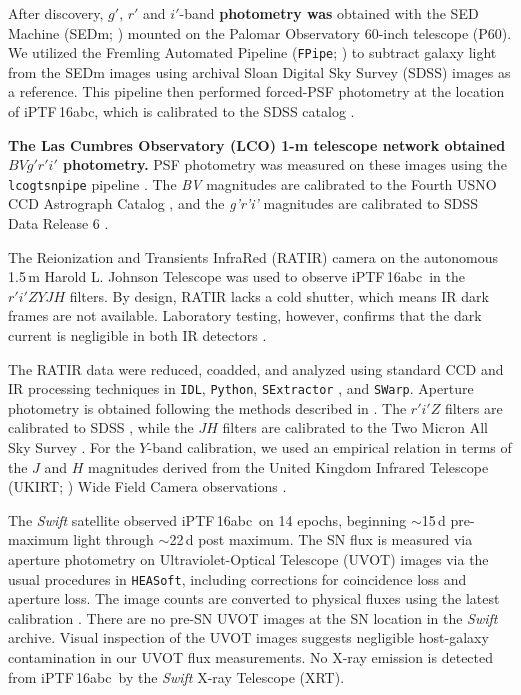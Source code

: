 \documentclass[twocolumn]{aastex61}
\newcommand{\abc}{iPTF\,16abc}
\begin{document}
After discovery, $g'$, $r'$ and $i'$-band \textbf{photometry was} obtained
with the SED Machine (SEDm; \citealt{2017arXiv171002917B}) mounted on the
Palomar Observatory 60-inch telescope (P60). We utilized the Fremling
Automated Pipeline (\texttt{FPipe}; \citealt{2016A&A...593A..68F}) to subtract
galaxy light from the SEDm images using archival Sloan Digital Sky Survey
(SDSS) images as a reference. This pipeline then performed forced-PSF
photometry at the location of \abc, which is calibrated to the SDSS catalog
\citep{2014ApJS..211...17A}.

\textbf{The Las Cumbres Observatory (LCO) 1-m telescope network obtained
$BVg'r'i'$ photometry.} PSF photometry was measured on these images using the
\texttt{lcogtsnpipe} pipeline \citep{2016MNRAS.459.3939V}. The \textit{BV}
magnitudes are calibrated to the Fourth USNO CCD Astrograph Catalog
\citep{2013AJ....145...44Z}, and the \textit{g'r'i'} magnitudes are calibrated
to SDSS Data Release 6 \citep{2008ApJS..175..297A}.

The Reionization and Transients InfraRed (RATIR) camera on the autonomous
1.5\,m Harold L. Johnson Telescope
\citep{2012SPIE.8446E..10B,2012SPIE.8444E..5LW} was used to observe \abc\ in
the $r'i'ZYJH$ filters. By design, RATIR lacks a cold shutter, which means IR
dark frames are not available. Laboratory testing, however, confirms that the
dark current is negligible in both IR detectors \citep{2012SPIE.8453E..1OF}.

The RATIR data were reduced, coadded, and analyzed using standard CCD and IR
processing techniques in \texttt{IDL}, \texttt{Python}, \texttt{SExtractor}
\citep{1996A&AS..117..393B}, and \texttt{SWarp}. Aperture photometry is
obtained following the methods described in \citet{2014AJ....148....2L}. The
$r'i'Z$ filters are calibrated to SDSS \citep{2014ApJS..211...17A}, while the
$JH$ filters are calibrated to the Two Micron All Sky Survey
\citep{2006AJ....131.1163S}. For the $Y$-band calibration, we used an
empirical relation in terms of the $J$ and $H$ magnitudes derived from the
United Kingdom Infrared Telescope (UKIRT; \citealt{2007A&A...467..777C}) Wide
Field Camera observations \citep{2009MNRAS.394..675H}.

The \textit{Swift} satellite observed \abc\ on 14 epochs, beginning
$\sim$15\,d pre-maximum light through $\sim$22\,d post maximum. The SN flux is
measured via aperture photometry on Ultraviolet-Optical Telescope (UVOT)
images via the usual procedures in \texttt{HEASoft}, including corrections for
coincidence loss and aperture loss. The image counts are converted to physical
fluxes using the latest calibration \citep{2011AIPC.1358..373B}. There are no
pre-SN UVOT images at the SN location in the \textit{Swift} archive. Visual
inspection of the UVOT images suggests negligible host-galaxy contamination in
our UVOT flux measurements. No X-ray emission is detected from \abc\ by the
\textit{Swift} X-ray Telescope (XRT).
\end{document}
